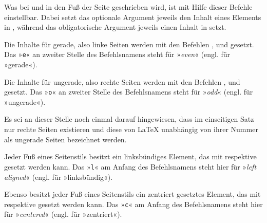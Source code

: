 \begin{Declaration}
\end{Declaration}
Was bei  und
 in den Fuß der Seite
geschrieben wird, ist mit Hilfe dieser Befehle einstellbar. Dabei setzt das
optionale Argument jeweils den Inhalt eines Elements in
, während das obligatorische
Argument jeweils einen Inhalt in 
setzt.

Die Inhalte für gerade, also linke Seiten werden mit den
Befehlen ,  und  gesetzt. Das
»\texttt{e}« an zweiter Stelle des Befehlsnamens steht %
\iffalse dabei \fi %
für »\emph{even}« (engl. für »gerade«).

Die Inhalte für ungerade, also rechte Seiten werden mit
den Befehlen ,  und  gesetzt. Das
»\texttt{o}« an zweiter Stelle des Befehlsnamens steht %
\iffalse dabei \fi %
für »\emph{odd}« (engl. für »ungerade«).

Es sei an dieser Stelle noch einmal darauf hingewiesen,
dass im einseitigen Satz nur rechte Seiten existieren und diese von \LaTeX{}
unabhängig von ihrer Nummer als ungerade Seiten bezeichnet werden.

Jeder Fuß eines Seitenstils besitzt ein linksbündiges
Element, das mit  respektive  gesetzt werden
kann. Das »\texttt{l}« am Anfang des Befehlsnamens steht hier für »\emph{left
  aligned}« (engl. für »linksbündig«).

Ebenso besitzt jeder Fuß eines Seitenstils ein zentriert
gesetztes Element, das mit  respektive  gesetzt
werden kann. Das »\texttt{c}« am Anfang des Befehlsnamens steht hier für
»\emph{centered}« (engl. für »zentriert«).

